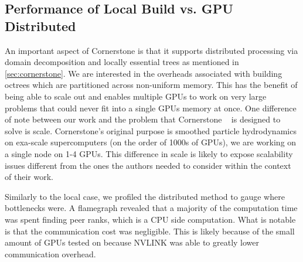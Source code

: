 
\subsection{Performance of Local Build vs. GPU Distributed}
\label{subsec:local_dist}

An important aspect of Cornerstone is that it supports distributed processing via domain decomposition and locally essential trees as mentioned in \ref{sec:cornerstone}. We are interested in the overheads associated with building octrees which are partitioned across non-uniform memory. This has the benefit of being able to scale out and enables multiple GPUs to work on very large problems that could never fit into a single GPUs memory at once. One difference of note between our work and the problem that Cornerstone ~\cite{cornerstone} is designed to solve is scale. Cornerstone's original purpose is smoothed particle hydrodynamics on exa-scale supercomputers (on the order of 1000s of GPUs), we are working on a single node on 1-4 GPUs. This difference in scale is likely to expose scalability issues different from the ones the authors needed to consider within the context of their work.

Similarly to the local case, we profiled the distributed method to gauge where bottlenecks were. A flamegraph revealed that a majority of the computation time was spent finding peer ranks, which is a CPU side computation. What is notable is that the communication cost was negligible. This is likely because of the small amount of GPUs tested on because NVLINK was able to greatly lower communication overhead.


